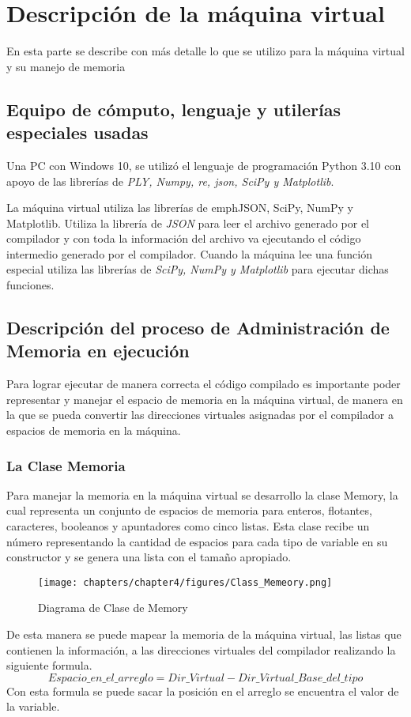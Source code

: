 \chapter{Descripción de la máquina virtual}

En esta parte se describe con más detalle lo que se utilizo para la máquina virtual y su manejo de memoria

\section{Equipo de cómputo, lenguaje y utilerías especiales usadas}

Una PC con Windows 10, se utilizó el lenguaje de programación Python 3.10 con apoyo de las librerías de \emph{PLY, Numpy, re, json, SciPy y Matplotlib}.

La máquina virtual utiliza las librerías de emph{JSON, SciPy, NumPy y Matplotlib}. Utiliza la librería de \emph{JSON} para leer el archivo generado por el compilador y con toda la información del archivo va ejecutando el código intermedio generado por el compilador. Cuando la máquina lee una función especial utiliza las librerías de \emph{SciPy, NumPy y Matplotlib} para ejecutar dichas funciones.


\section{Descripción del proceso de Administración de Memoria en ejecución}
Para lograr ejecutar de manera correcta el código compilado es importante poder representar y manejar el espacio de memoria en la máquina virtual, de manera en la que se pueda convertir las direcciones virtuales asignadas por el compilador a espacios de memoria en la máquina.

\subsection{La Clase Memoria}

Para manejar la memoria en la máquina virtual se desarrollo la clase Memory, la cual representa un conjunto de espacios de memoria para enteros, flotantes, caracteres, booleanos y apuntadores como cinco listas. Esta clase recibe un número representando la cantidad de espacios para cada tipo de variable en su constructor y se genera una lista con el tamaño apropiado.

\begin{figure}[htbp]
    \centering
    \texttt{[image: chapters/chapter4/figures/Class\_Memeory.png]}
    \caption{Diagrama de Clase de Memory}
    \label{fig:my_label}
\end{figure}
\FloatBarrier
De esta manera se puede mapear la memoria de la máquina virtual, las listas que contienen la información, a las direcciones virtuales del compilador realizando la siguiente formula.
$$Espacio\_en\_el\_arreglo = Dir\_Virtual - Dir\_Virtual\_Base\_del\_tipo$$
Con esta formula se puede sacar la posición en el arreglo se encuentra el valor de la variable.


